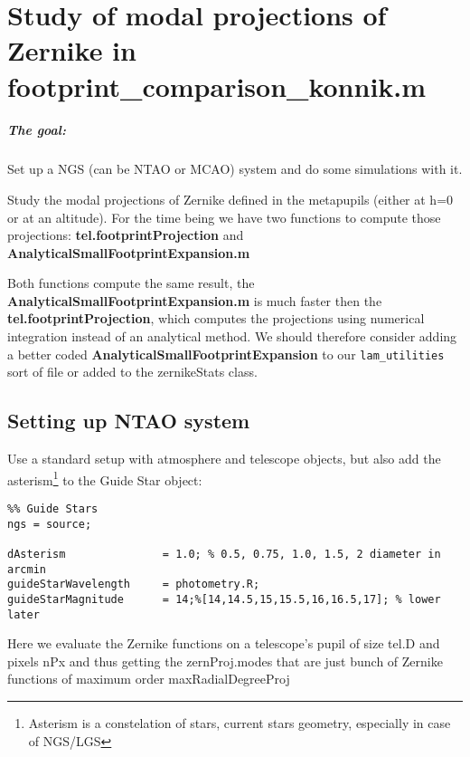 \documentclass[a4paper,11pt]{book}
\begin{document}
\chapter{Study of modal projections of Zernike in footprint\_comparison\_konnik.m}

\paragraph{The goal:}
Set up a NGS (can be NTAO or MCAO) system and do some simulations with it.

Study the modal projections of Zernike defined in the metapupils (either at h=0 or at an altitude). 
For the time being we have two functions to compute those projections: \textbf{tel.footprintProjection} and 
\textbf{AnalyticalSmallFootprintExpansion.m} 

Both functions compute the same result, the 
\textbf{AnalyticalSmallFootprintExpansion.m} is much faster then the \textbf{tel.footprintProjection}, which computes the projections using numerical integration instead of an analytical method. We should therefore consider adding a better coded \textbf{AnalyticalSmallFootprintExpansion} to our \verb+lam_utilities+ sort of file or  added to the zernikeStats class.



\section{Setting up NTAO system}
Use a standard setup with atmosphere and telescope objects, but also add the asterism\footnote{Asterism is a constelation of stars, current stars geometry, especially in case of NGS/LGS} to the Guide Star object:

\begin{verbatim}
%% Guide Stars
ngs = source;

dAsterism               = 1.0; % 0.5, 0.75, 1.0, 1.5, 2 diameter in arcmin
guideStarWavelength     = photometry.R;
guideStarMagnitude      = 14;%[14,14.5,15,15.5,16,16.5,17]; % lower later
\end{verbatim}

Here we evaluate the Zernike functions on a telescope's pupil
of size tel.D and pixels nPx  and thus getting the zernProj.modes
that are just bunch of Zernike functions of maximum order maxRadialDegreeProj
\end{document}
